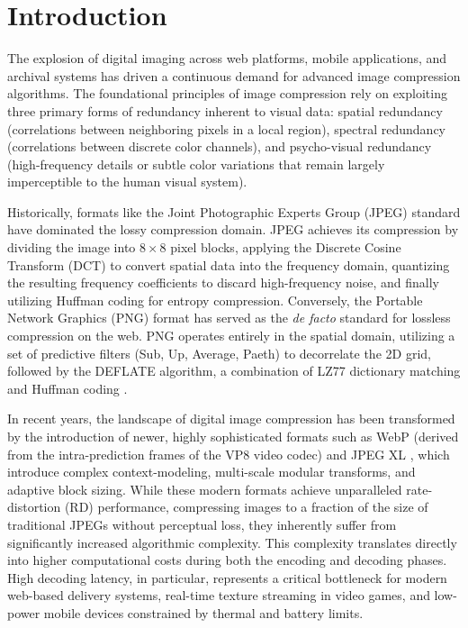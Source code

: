 \chapter{Introduction}
\label{ch:introduction}

The explosion of digital imaging across web platforms, mobile applications, and archival systems has driven a continuous demand for advanced image compression algorithms. The foundational principles of image compression rely on exploiting three primary forms of redundancy inherent to visual data: spatial redundancy (correlations between neighboring pixels in a local region), spectral redundancy (correlations between discrete color channels), and psycho-visual redundancy (high-frequency details or subtle color variations that remain largely imperceptible to the human visual system). 

Historically, formats like the Joint Photographic Experts Group (JPEG) standard have dominated the lossy compression domain. JPEG achieves its compression by dividing the image into $8 \times 8$ pixel blocks, applying the Discrete Cosine Transform (DCT) to convert spatial data into the frequency domain, quantizing the resulting frequency coefficients to discard high-frequency noise, and finally utilizing Huffman coding for entropy compression. Conversely, the Portable Network Graphics (PNG) format has served as the \textit{de facto} standard for lossless compression on the web. PNG operates entirely in the spatial domain, utilizing a set of predictive filters (Sub, Up, Average, Paeth) to decorrelate the 2D grid, followed by the DEFLATE algorithm, a combination of LZ77 dictionary matching and Huffman coding \cite{roelofs1999png}.

In recent years, the landscape of digital image compression has been transformed by the introduction of newer, highly sophisticated formats such as WebP \cite{google2010webp} (derived from the intra-prediction frames of the VP8 video codec) and JPEG XL \cite{alakuijala2019jpeg}, which introduce complex context-modeling, multi-scale modular transforms, and adaptive block sizing. While these modern formats achieve unparalleled rate-distortion (RD) performance, compressing images to a fraction of the size of traditional JPEGs without perceptual loss, they inherently suffer from significantly increased algorithmic complexity. This complexity translates directly into higher computational costs during both the encoding and decoding phases. High decoding latency, in particular, represents a critical bottleneck for modern web-based delivery systems, real-time texture streaming in video games, and low-power mobile devices constrained by thermal and battery limits.

